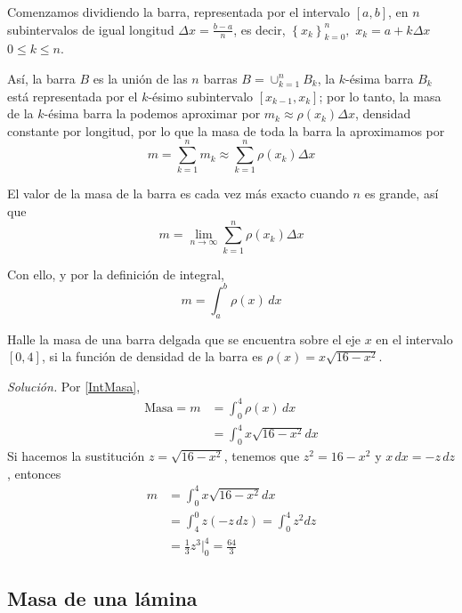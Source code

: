 Comenzamos dividiendo la barra, representada por el intervalo $\left[ a,b%
\right] $, en $n$ subintervalos de igual longitud $\Delta x=\frac{b-a}{n}$, es decir, $\left\{ x_{k}\right\} _{k=0}^{n},$ $x_{k}=a+k\Delta x$ \ $0\leq k\leq n$.

\enlargethispage*{\baselineskip}

Así, la barra $B$ es la unión de las $n$ barras $B=\cup_{k=1}^{n}B_{k}$, la $k$-ésima barra $B_{k}$ está representada por el $k$-ésimo
subintervalo $\left[ x_{k-1},x_{k}\right] $; por lo tanto, la masa de la $k$-ésima barra la podemos aproximar por $m_{k}\approx \rho \left( x_{k}\right)
\Delta x$, densidad constante por longitud, por lo que la masa de toda la barra la aproximamos por
\[
m=\sum_{k=1}^{n}m_{k}\approx \sum_{k=1}^{n}\rho \left( x_{k}\right)\Delta x
\]

El valor de la masa de la barra es cada vez más exacto cuando $n$ es grande, así que
\[
m=\lim_{n\rightarrow \infty }\sum_{k=1}^{n}\rho \left( x_{k}\right)
\Delta x
\]

Con ello, y por la definición de integral,
\begin{equation}\label{IntMasa}
m=\int_{a}^{b}\rho \left( x\right)\,dx
\end{equation}

\begin{ejemplo} Halle la masa de una barra delgada que se encuentra sobre el eje $x$ en el intervalo $\left[ 0,4\right]$, si la función de densidad de la
barra es $\rho \left( x\right) =x\sqrt{16-x^{2}}$.
\end{ejemplo}

\emph{Solución.} Por \eqref{IntMasa},
\begin{align*}
\text{Masa}=m&=\int_{0}^{4}\rho \left( x\right)\,dx\\
&=\int_{0}^{4}x\sqrt{16-x^{2}}dx
\end{align*}
Si hacemos la sustitución $z=\sqrt{16-x^{2}}$, tenemos que $z^{2}=16-x^{2}$ y $x\,dx=-z\,dz$, entonces
\begin{align*}
m&=\int_{0}^{4}x\sqrt{16-x^{2}}dx\\
&=\int_{4}^{0}z\left( -z\,dz\right)=\int_{0}^{4}z^{2}dz\\
&=\frac{1}{3}z^{3}\Big\vert _{0}^{4} =\frac{64}{3}
\end{align*}

\subsection{Masa de una lámina}

